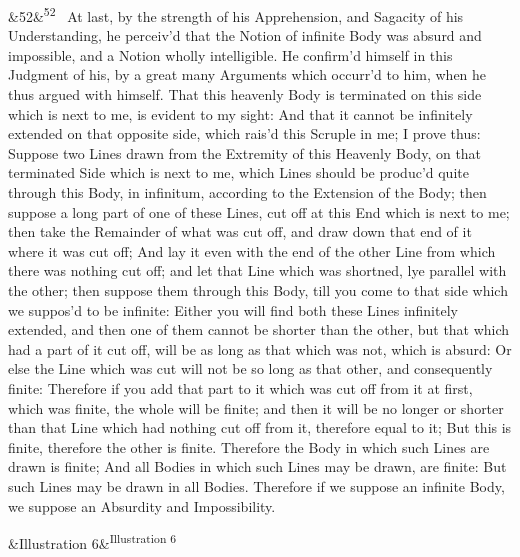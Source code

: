 \documentclass[12pt]{article}
\newcommand{\para}[1][]{\par\noindent\ifx&#1&\else\textsuperscript{\footnotesize #1}~\fi}
\begin{document}
\para[52] At last, by the strength of his Apprehension, and Sagacity of his Understanding, he perceiv'd that the Notion of infinite Body was absurd and impossible, and a Notion wholly intelligible. He confirm'd himself in this Judgment of his, by a great many Arguments which occurr'd to him, when he thus argued with himself. That this heavenly Body is terminated on this side which is next to me, is evident to my sight: And that it cannot be infinitely extended on that opposite side, which rais'd this Scruple in me; I prove thus: Suppose two Lines drawn from the Extremity of this Heavenly Body, on that terminated Side which is next to me, which Lines should be produc'd quite through this Body, in infinitum, according to the Extension of the Body; then suppose a long part of one of these Lines, cut off at this End which is next to me; then take the Remainder of what was cut off, and draw down that end of it where it was cut off; And lay it even with the end of the other Line from which there was nothing cut off; and let that Line which was shortned, lye parallel with the other; then suppose them through this Body, till you come to that side which we suppos'd to be infinite: Either you will find both these Lines infinitely extended, and then one of them cannot be shorter than the other, but that which had a part of it cut off, will be as long as that which was not, which is absurd: Or else the Line which was cut will not be so long as that other, and consequently finite: Therefore if you add that part to it which was cut off from it at first, which was finite, the whole will be finite; and then it will be no longer or shorter than that Line which had nothing cut off from it, therefore equal to it; But this is finite, therefore the other is finite. Therefore the Body in which such Lines are drawn is finite; And all Bodies in which such Lines may be drawn, are finite: But such Lines may be drawn in all Bodies. Therefore if we suppose an infinite Body, we suppose an Absurdity and Impossibility.

\para [Illustration 6]
\end{document}
